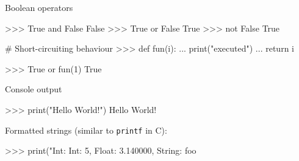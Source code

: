 \documentclass[10pt]{beamer}
\begin{document}

\begin{frame}[fragile]{Boolean operators}

    \begin{pythoncode}
        >>> True and False
        False
        >>> True or False
        True
        >>> not False
        True
    \end{pythoncode}

    \pause

    \begin{pythoncode}
        # Short-circuiting behaviour
        >>> def fun(i):
        ...     print("executed")
        ...     return i

        >>> True or fun(1)
        True
    \end{pythoncode}

\end{frame}


\begin{frame}[fragile]{Console output}

    \begin{pythoncode}
        >>> print("Hello World!")
        Hello World!
    \end{pythoncode}

    \pause

    Formatted strings (similar to \texttt{printf} in C):

    \begin{pythoncode}
        >>> print("Int: %
        Int: 5, Float: 3.140000, String: foo
    \end{pythoncode}

\end{frame}

\end{document}
